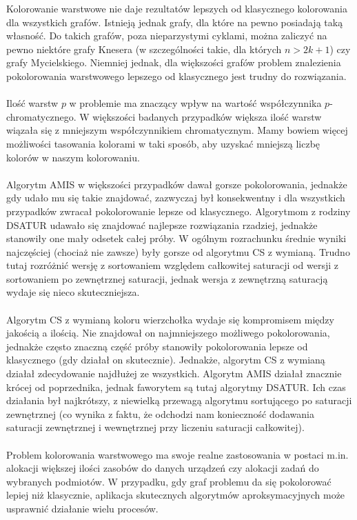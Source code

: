 \documentclass[10pt,a4paper]{article}
\begin{document}
	Kolorowanie warstwowe nie daje rezultatów lepszych od klasycznego kolorowania dla wszystkich grafów. Istnieją jednak grafy, dla które na pewno posiadają taką własność. Do takich grafów, poza nieparzystymi cyklami, można zaliczyć na pewno niektóre grafy Knesera (w szczególności takie, dla których $n > 2k + 1$) czy grafy Mycielskiego. Niemniej jednak, dla większości grafów problem znalezienia pokolorowania warstwowego lepszego od klasycznego jest trudny do rozwiązania.
	\\~\\
	Ilość warstw $p$ w problemie ma znaczący wpływ na wartość współczynnika $p$-chromatycznego. W większości badanych przypadków większa ilość warstw wiązała się z mniejszym współczynnikiem chromatycznym. Mamy bowiem więcej możliwości tasowania kolorami w taki sposób, aby uzyskać mniejszą liczbę kolorów w naszym kolorowaniu. 
	\\~\\
	Algorytm AMIS w większości przypadków dawał gorsze pokolorowania, jednakże gdy udało mu się takie znajdować, zazwyczaj był konsekwentny i dla wszystkich przypadków zwracał pokolorowanie lepsze od klasycznego. Algorytmom z rodziny DSATUR udawało się znajdować najlepsze rozwiązania rzadziej, jednakże stanowiły one mały odsetek całej próby. W ogólnym rozrachunku średnie wyniki najczęściej (chociaż nie zawsze) były gorsze od algorytmu CS z wymianą. Trudno tutaj rozróżnić wersję z sortowaniem względem całkowitej saturacji od wersji z sortowaniem po zewnętrznej saturacji, jednak wersja z zewnętrzną saturacją wydaje się nieco skuteczniejsza. 
	\\~\\
	Algorytm CS z wymianą koloru wierzchołka wydaje się kompromisem między jakością a ilością. Nie znajdował on najmniejszego możliwego pokolorowania, jednakże często znaczną część próby stanowiły pokolorowania lepsze od klasycznego (gdy działał on skutecznie). Jednakże, algorytm CS z wymianą działał zdecydowanie najdłużej ze wszystkich. Algorytm AMIS działał znacznie krócej od poprzednika, jednak faworytem są tutaj algorytmy DSATUR. Ich czas działania był najkrótszy, z niewielką przewagą algorytmu sortującego po saturacji zewnętrznej (co wynika z faktu, że odchodzi nam konieczność dodawania saturacji zewnętrznej i wewnętrznej przy liczeniu saturacji całkowitej).
	\\~\\
	Problem kolorowania warstwowego ma swoje realne zastosowania w postaci m.in. alokacji większej ilości zasobów do danych urządzeń czy alokacji zadań do wybranych podmiotów. W przypadku, gdy graf problemu da się pokolorować lepiej niż klasycznie, aplikacja skutecznych algorytmów aproksymacyjnych może usprawnić działanie wielu procesów. 
	
\end{document}

